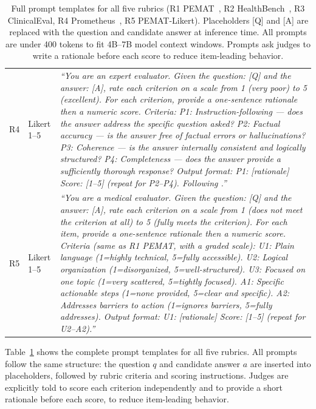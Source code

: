 \documentclass[11pt]{article}
\begin{document}
\begin{table}[h!]
\begin{tabularx}{\textwidth}{@{}l l X@{}}
R4 & Likert 1--5 &
  \textit{``You are an expert evaluator. Given the question: [Q] and the
  answer: [A], rate each criterion on a scale from 1 (very poor) to 5
  (excellent). For each criterion, provide a one-sentence rationale then a
  numeric score. Criteria: P1: Instruction-following --- does the answer
  address the specific question asked? P2: Factual accuracy --- is the
  answer free of factual errors or hallucinations? P3: Coherence ---
  is the answer internally consistent and logically structured? P4:
  Completeness --- does the answer provide a sufficiently thorough
  response? Output format: P1: [rationale] Score: [1--5] (repeat for
  P2--P4). Following \citet{kim2024prometheus}.''} \\[6pt]
R5 & Likert 1--5 &
  \textit{``You are a medical evaluator. Given the question: [Q] and the
  answer: [A], rate each criterion on a scale from 1 (does not meet the
  criterion at all) to 5 (fully meets the criterion). For each item, provide
  a one-sentence rationale then a numeric score. Criteria (same as R1 PEMAT,
  with a graded scale): U1: Plain language (1=highly technical, 5=fully
  accessible). U2: Logical organization (1=disorganized, 5=well-structured).
  U3: Focused on one topic (1=very scattered, 5=tightly focused). A1:
  Specific actionable steps (1=none provided, 5=clear and specific). A2:
  Addresses barriers to action (1=ignores barriers, 5=fully addresses).
  Output format: U1: [rationale] Score: [1--5] (repeat for U2--A2).''} \\
\bottomrule
\end{tabularx}
\caption{Full prompt templates for all five rubrics (R1 PEMAT~\cite{shoemaker2014development},
R2 HealthBench~\cite{arora2025healthbench}, R3 ClinicalEval, R4 Prometheus~\cite{kim2024prometheus},
R5 PEMAT-Likert). Placeholders [Q] and [A] are replaced with the question
and candidate answer at inference time. All prompts are under 400 tokens
to fit 4B--7B model context windows. Prompts ask judges to write a
rationale before each score to reduce item-leading behavior.}
\label{tab:prompts}
\end{table}

Table~\ref{tab:prompts} shows the complete prompt templates for all
five rubrics. All prompts
follow the same structure: the question $q$ and candidate answer $a$
are inserted into placeholders, followed by rubric criteria and scoring
instructions. Judges are explicitly told to score each criterion
independently and to provide a short rationale before each score, to
reduce item-leading behavior.

\end{document}
